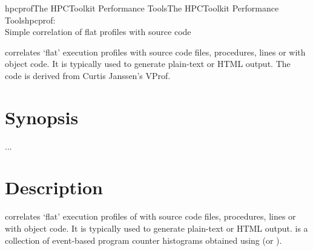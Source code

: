\documentclass[english]{article}
\begin{document}
\begin{Name}{1}{hpcprof}{The HPCToolkit Performance Tools}{The HPCToolkit Performance Tools}{hpcprof:\\ Simple correlation of flat profiles with source code}

 correlates `flat' execution profiles with source code files, procedures, lines or with object code.
It is typically used to generate plain-text or HTML output.
The code is derived from Curtis Janssen's VProf.

\end{Name}

\section{Synopsis}

   ...

\section{Description}

 correlates `flat' execution profiles of  with source code files, procedures, lines or with object code.
It is typically used to generate plain-text or HTML output.
 is a collection of event-based program counter histograms obtained using  (or ).
\end{document}
